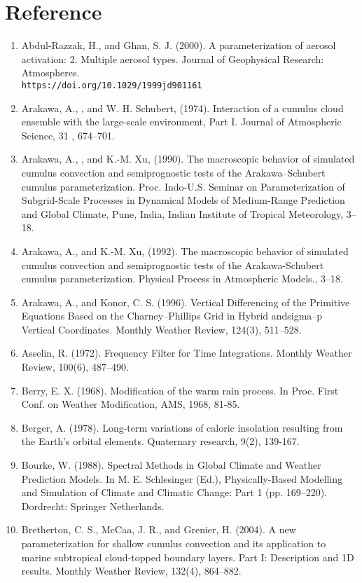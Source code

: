 \section{Reference}
\begin{enumerate}
\setlength{\parskip}{0pt} %
\setlength{\itemsep}{5pt} %
\setlength{\leftskip}{0pt} %
\item Abdul-Razzak, H., and Ghan, S. J. (2000). A parameterization of aerosol activation: 2. Multiple aerosol types. Journal of Geophysical Research: Atmospheres. \\
\texttt{https://doi.org/10.1029/1999jd901161}
\item Arakawa, A., , and W. H. Schubert, (1974). Interaction of a cumulus cloud ensemble with the large-scale environment, Part I. Journal of Atmospheric Science, 31 , 674–701.
\item Arakawa, A., , and K.-M. Xu, (1990). The macroscopic behavior of simulated cumulus convection and semiprognostic tests of the Arakawa–Schubert cumulus parameterization. Proc. Indo-U.S. Seminar on Parameterization of Subgrid-Scale Processes in Dynamical Models of Medium-Range Prediction and Global Climate, Pune, India, Indian Institute of Tropical Meteorology, 3–18.
\item Arakawa, A., and K.-M. Xu, (1992). The macroscopic behavior of simulated cumulus convection and semiprognostic tests of the Arakawa-Schubert cumulus parameterization. Physical Process in Atmospheric Models., 3–18.
\item Arakawa, A., and Konor, C. S. (1996). Vertical Differencing of the Primitive Equations Based on the Charney–Phillips Grid in Hybrid andsigma–p Vertical Coordinates. Monthly Weather Review, 124(3), 511–528.
\item Asselin, R. (1972). Frequency Filter for Time Integrations. Monthly Weather Review, 100(6), 487–490.
\item Berry, E. X. (1968). Modification of the warm rain process. In Proc. First Conf. on Weather Modification, AMS, 1968, 81-85.
\item Berger, A. (1978). Long-term variations of caloric insolation resulting from the Earth's orbital elements. Quaternary research, 9(2), 139-167.
\item Bourke, W. (1988). Spectral Methods in Global Climate and Weather Prediction Models. In M. E. Schlesinger (Ed.), Physically-Based Modelling and Simulation of Climate and Climatic Change: Part 1 (pp. 169–220). Dordrecht: Springer Netherlands.
\item Bretherton, C. S., McCaa, J. R., and Grenier, H. (2004). A new parameterization for shallow cumulus convection and its application to marine subtropical cloud-topped boundary layers. Part I: Description and 1D results. Monthly Weather Review, 132(4), 864–882.

\end{enumerate}
